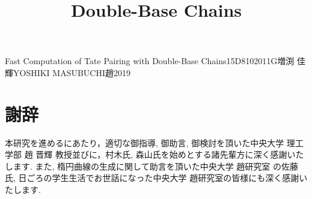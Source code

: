 \documentclass[a4j,oneside,openany]{jsbook}
\begin{document}

\title{Double-Base Chains}{Fast Computation of Tate Pairing with Double-Base Chains}{15D8102011G}{増渕 佳輝}{YOSHIKI MASUBUCHI}{趙}{2019}

\setcounter{page}{1}


\newpage

\tableofcontents
\newpage











\chapter*{謝辞}
本研究を進めるにあたり，適切な御指導, 御助言, 御検討を頂いた中央大学 理工学部 趙 晋輝 教授並びに，村木氏, 森山氏を始めとする諸先輩方に深く感謝いたします. また, 楕円曲線の生成に関して助言を頂いた中央大学 趙研究室 の佐藤氏, 日ごろの学生生活でお世話になった中央大学 趙研究室の皆様にも深く感謝いたします.
\end{document}
